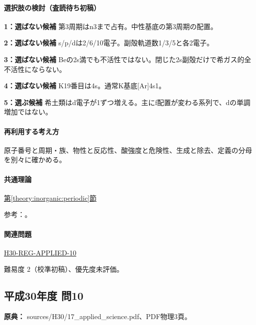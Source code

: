 \paragraph{選択肢の検討（査読待ち初稿）}\mbox{}\par

\noindent\textbf{1：選ばない候補} 第3周期はn3まで占有。中性基底の第3周期の配置。\par

\noindent\textbf{2：選ばない候補} s/p/dは2/6/10電子。副殻軌道数1/3/5と各2電子。\par

\noindent\textbf{3：選ばない候補} Beの2s満でも不活性ではない。閉じた2s副殻だけで希ガス的全不活性にならない。\par

\noindent\textbf{4：選ばない候補} K19番目は4s。通常K基底[Ar]4s1。\par

\noindent\textbf{5：選ぶ候補} 希土類はd電子が1ずつ増える。主にf配置が変わる系列で、dの単調増加ではない。\par

\paragraph{再利用する考え方} 原子番号と周期・族、物性と反応性、酸強度と危険性、生成と除去、定義の分母を別々に確かめる。

\paragraph{共通理論} \hyperref[theory:inorganic:periodic]{第\ref*{theory:inorganic:periodic}節}

\par 参考：\cite{atomic_nist2019,inorganic_periodic_ref}。

\paragraph{関連問題} \hyperref[q:h30-reg-applied-10]{H30-REG-APPLIED-10}

\par 難易度 2（校準初稿）、優先度未評価。

\subsection{平成30年度 問10}
\label{q:h30-reg-applied-10}

\noindent\textbf{原典：} sources/H30/17\_applied\_science.pdf、PDF物理3頁。

